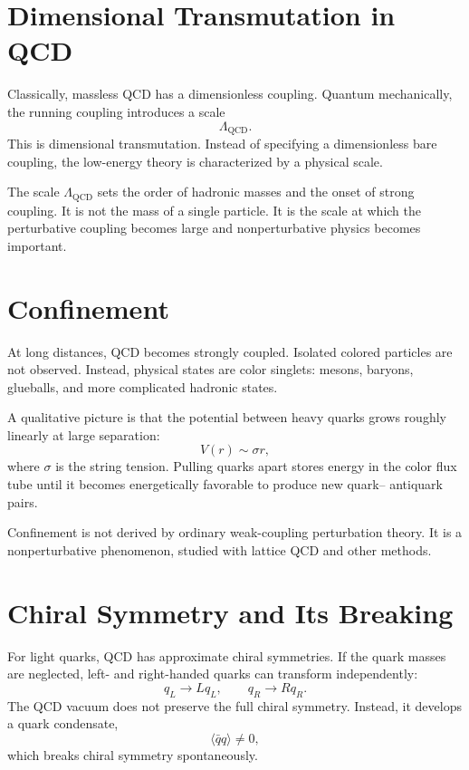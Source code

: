 \section{Dimensional Transmutation in QCD}

Classically, massless QCD has a dimensionless coupling. Quantum mechanically,
the running coupling introduces a scale
\[
    \Lambda_{\mathrm{QCD}}.
\]
This is dimensional transmutation. Instead of specifying a dimensionless bare
coupling, the low-energy theory is characterized by a physical scale.

The scale \(\Lambda_{\mathrm{QCD}}\) sets the order of hadronic masses and the
onset of strong coupling. It is not the mass of a single particle. It is the
scale at which the perturbative coupling becomes large and nonperturbative
physics becomes important.

\section{Confinement}

At long distances, QCD becomes strongly coupled. Isolated colored particles are
not observed. Instead, physical states are color singlets: mesons, baryons,
glueballs, and more complicated hadronic states.

A qualitative picture is that the potential between heavy quarks grows roughly
linearly at large separation:
\[
    V(r)\sim \sigma r,
\]
where \(\sigma\) is the string tension. Pulling quarks apart stores energy in the
color flux tube until it becomes energetically favorable to produce new quark--
antiquark pairs.

Confinement is not derived by ordinary weak-coupling perturbation theory. It is a
nonperturbative phenomenon, studied with lattice QCD and other methods.

\section{Chiral Symmetry and Its Breaking}

For light quarks, QCD has approximate chiral symmetries. If the quark masses are
neglected, left- and right-handed quarks can transform independently:
\[
    q_L\longrightarrow L q_L,
    \qquad
    q_R\longrightarrow R q_R.
\]
The QCD vacuum does not preserve the full chiral symmetry. Instead, it develops a
quark condensate,
\[
    \langle\bar q q\rangle\neq0,
\]
which breaks chiral symmetry spontaneously.

